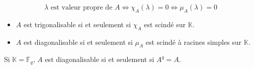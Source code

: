 	
	\begin{proposition}
		\[ \lambda \text{ est valeur propre de } A \iff \chi_A(\lambda) = 0 \iff \mu_A(\lambda) = 0 \]
	\end{proposition}
	
	
	\begin{proposition}
		\begin{itemize}
			\item $A$ est trigonalisable si et seulement si $\chi_A$ est scindé sur $\mathbb{K}$.
			\item $A$ est diagonalisable si et seulement si $\mu_A$ est scindé à racines simples sur $\mathbb{K}$.
		\end{itemize}
	\end{proposition}
	
	\begin{remark}
		Si $\mathbb{K} = \mathbb{F}_q$, $A$ est diagonalisable si et seulement si $A^q = A$.
	\end{remark}
